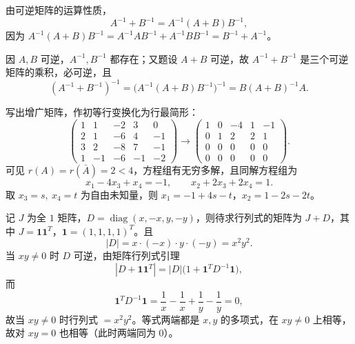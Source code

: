 \begin{solution}
由可逆矩阵的运算性质，
\[
A^{-1}+B^{-1}=A^{-1}(A+B)B^{-1},
\]
因为 $A^{-1}(A+B)B^{-1}=A^{-1}AB^{-1}+A^{-1}BB^{-1}=B^{-1}+A^{-1}$。

因 $A,B$ 可逆，$A^{-1},B^{-1}$ 都存在；又题设 $A+B$ 可逆，故 $A^{-1}+B^{-1}$ 是三个可逆矩阵的乘积，必可逆，且
\[
(A^{-1}+B^{-1})^{-1}=\bigl(A^{-1}(A+B)B^{-1}\bigr)^{-1}=B(A+B)^{-1}A .
\]
\end{solution}

\begin{solution}
写出增广矩阵，作初等行变换化为行最简形：
\[
\left(\begin{array}{cccc|c}
1&1&-2&3&0\\2&1&-6&4&-1\\3&2&-8&7&-1\\1&-1&-6&-1&-2
\end{array}\right)
\to\left(\begin{array}{cccc|c}
1&0&-4&1&-1\\0&1&2&2&1\\0&0&0&0&0\\0&0&0&0&0
\end{array}\right).
\]
可见 $r(A)=r(\bar A)=2<4$，方程组有无穷多解，且同解方程组为
\[
x_1-4x_3+x_4=-1,\qquad x_2+2x_3+2x_4=1 .
\]
取 $x_3=s,\ x_4=t$ 为自由未知量，则 $x_1=-1+4s-t$，$x_2=1-2s-2t$。
\end{solution}

\begin{solution}
记 $J$ 为全 $1$ 矩阵，$D=\operatorname{diag}(x,-x,y,-y)$，则待求行列式的矩阵为 $J+D$，其中 $J=\mathbf{1}\mathbf{1}^{T}$，$\mathbf{1}=(1,1,1,1)^{T}$。且
\[
|D|=x\cdot(-x)\cdot y\cdot(-y)=x^{2}y^{2}.
\]
当 $xy\ne0$ 时 $D$ 可逆，由矩阵行列式引理
\[
|D+\mathbf{1}\mathbf{1}^{T}|=|D|\bigl(1+\mathbf{1}^{T}D^{-1}\mathbf{1}\bigr),
\]
而
\[
\mathbf{1}^{T}D^{-1}\mathbf{1}=\frac1x-\frac1x+\frac1y-\frac1y=0,
\]
故当 $xy\ne0$ 时行列式 $=x^{2}y^{2}$。等式两端都是 $x,y$ 的多项式，在 $xy\ne0$ 上相等，故对 $xy=0$ 也相等（此时两端同为 $0$）。
\end{solution}


